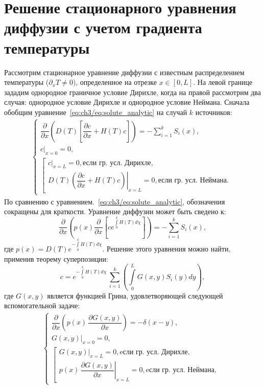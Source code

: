 \chapter{Решение стационарного уравнения диффузии с учетом градиента температуры}\label{app:E}

Рассмотрим стационарное уравнение диффузии с известным распределением температуры ($\partial_x T \neq 0$), определенное на отрезке \( x \in [0, L] \). На левой границе зададим однородное граничное условие Дирихле, когда на правой рассмотрим два случая: однородное условие Дирихле и однородное условие Неймана. Сначала обобщим уравнение~\eqref{eq:ch3/eq:solute_analytic} на случай $k$ источников:
\begin{align}
	\label{eq:general_stat_dif}
	\begin{cases}
		\dfrac{\partial}{\partial x}\left( D(T)\left[ \dfrac{\partial c}{\partial x} + H(T)c\right]\right)=-\sum\limits_{i=1}^k S_i(x), \\[5pt]
		\left.c\right\vert_{x=0}=0,                                                                                                     \\[5pt]
		\left[\begin{array}{ll}
			      \left.c\right\vert_{x=L}=0,  \text{если гр. усл. Дирихле}, \\[5pt]
			      \left.D(T)\left( \dfrac{\partial c}{\partial x} + H(T)c\right)\right\vert_{x=L}=0,  \text{если гр. усл. Неймана}.
		      \end{array}
		\right.
	\end{cases}
\end{align}
По сравнению с уравнением.~\eqref{eq:ch3/eq:solute_analytic}, обозначения сокращены для краткости. Уравнение диффузии может быть сведено к:
\begin{equation}
	\frac{\partial}{\partial x}\left(p(x)\frac{\partial}{\partial x}\left[ ce^{\int\limits_0^x H(T)d\chi}\right]\right)=-\sum\limits_{i=1}^k S_i(x),
\end{equation}
где $p(x)=D(T)e^{-\int\limits_0^x H(T)d\chi}$. Решение этого уравнения можно найти, применив теорему суперпозиции:
\begin{equation}
	\label{eq:ST}
	c=e^{-\int\limits_0^x H(T)d\chi}\,\sum\limits_{i=1}^k \left( \int\limits_0^L G(x,y)S_i(y)dy \right),
\end{equation}
где $G(x,y)$ является функцией Грина, удовлетворяющей следующей вспомогательной задаче:
\begin{align}
	\label{eq:Green_problem}
	\begin{cases}
		\dfrac{\partial}{\partial x}\left(p(x)\,\dfrac{\partial G(x,y)}{\partial x}\right)=-\delta(x-y), \\[5pt]
		\left.G(x,y)\right\vert_{x=0}=0,                                                                 \\[5pt]
		\left[\begin{array}{ll}
			      \left.G(x,y)\right\vert_{x=L}=0,  \text{eсли гр. усл. Дирихле}, \\[5pt]
			      \left.p(x)\,\dfrac{\partial G(x,y)}{\partial x}\right\vert_{x=L}=0,  \text{eсли гр. усл. Неймана},
		      \end{array}\right.
	\end{cases}
\end{align}
